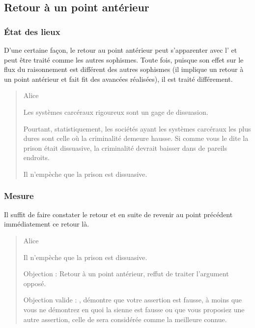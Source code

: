 \subsection{Retour à un point antérieur}
\subsubsection{État des lieux}
D’une certaine façon, le retour au point antérieur peut s’apparenter avec l’ et peut être traité comme les autres sophismes. Toute fois, puisque son effet sur le flux du raisonnement est différent des autres sophismes (il implique un retour à un point antérieur et fait fit des avancées réalisées), il est traité différement.

\begin{quote}
  \begin{drama}{0cm}{0cm}{Alice}

    \Aspeaks       Les systèmes carcéraux rigoureux sont un gage de dissuasion.

    \Bspeaks       Pourtant, statistiquement, les sociétés ayant les systèmes carcéraux les plus dures sont celle où la criminalité demeure hausse. Si comme vous le dite la prison était dissuasive, la criminalité devrait baisser dans de pareils endroits.

    \Aspeaks       Il n’empèche que la prison est dissuasive.

  \end{drama}
\end{quote}

\subsubsection{Mesure}
Il suffit de faire constater le retour et en suite de revenir au point précédent immédiatement ce retour là.
\begin{quote}
  \begin{drama}{0cm}{0cm}{Alice}

    \Aspeaks       Il n’empèche que la prison est dissuasive.

    \Bspeaks       Objection : Retour à un point antérieur, reffut de traiter l’argument opposé.

    \Arbitrespeaks Objection valide : \A, \B démontre que votre assertion est fausse, à moins que vous ne démontrez en quoi la sienne est fausse ou que vous proposiez une autre assertion, celle de \B sera considérée comme la meilleure connue.

  \end{drama}
\end{quote}

